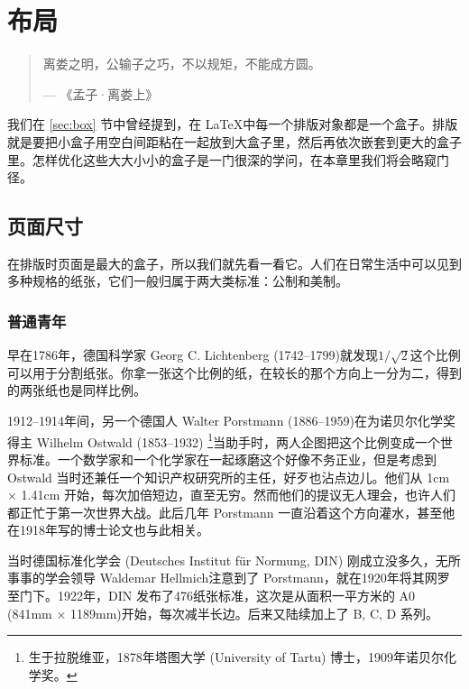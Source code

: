 \chapter{布局}

\begin{quotation}
离娄之明，公输子之巧，不以规矩，不能成方圆。
\begin{flushright}
--- 《孟子·离娄上》
\end{flushright}
\end{quotation}

我们在 \ref{sec:box} 节中曾经提到，在 \LaTeX 中每一个排版对象都是一个盒子。排版就是要把小盒子用空白间距粘在一起放到大盒子里，然后再依次嵌套到更大的盒子里。怎样优化这些大大小小的盒子是一门很深的学问，在本章里我们将会略窥门径。

\section{页面尺寸}

在排版时页面是最大的盒子，所以我们就先看一看它。人们在日常生活中可以见到多种规格的纸张，它们一般归属于两大类标准：公制和美制。

\subsection{普通青年}

早在1786年，德国科学家 Georg C. Lichtenberg (1742--1799)\indexLichtenberg 就发现$1/\sqrt{2}$这个比例可以用于分割纸张。你拿一张这个比例的纸，在较长的那个方向上一分为二，得到的两张纸也是同样比例。

1912--1914年间，另一个德国人 Walter Porstmann (1886--1959)\indexPorstmann 在为诺贝尔化学奖得主 Wilhelm Ostwald (1853--1932)\indexOstwald{} \footnote{生于拉脱维亚，1878年塔图大学 (University of Tartu) 博士，1909年诺贝尔化学奖。}当助手时，两人企图把这个比例变成一个世界标准。一个数学家和一个化学家在一起琢磨这个好像不务正业，但是考虑到 Ostwald 当时还兼任一个知识产权研究所的主任，好歹也沾点边儿。他们从 1cm × 1.41cm 开始，每次加倍短边，直至无穷。然而他们的提议无人理会，也许人们都正忙于第一次世界大战。此后几年 Porstmann 一直沿着这个方向灌水，甚至他在1918年写的博士论文也与此相关。

当时德国标准化学会 (Deutsches Institut für Normung, DIN) 刚成立没多久，无所事事的学会领导 Waldemar Hellmich\indexHellmich 注意到了 Porstmann，就在1920年将其网罗至门下。1922年，DIN 发布了476纸张标准，这次是从面积一平方米的 A0 (841mm × 1189mm)开始，每次减半长边。后来又陆续加上了 B, C, D 系列。

